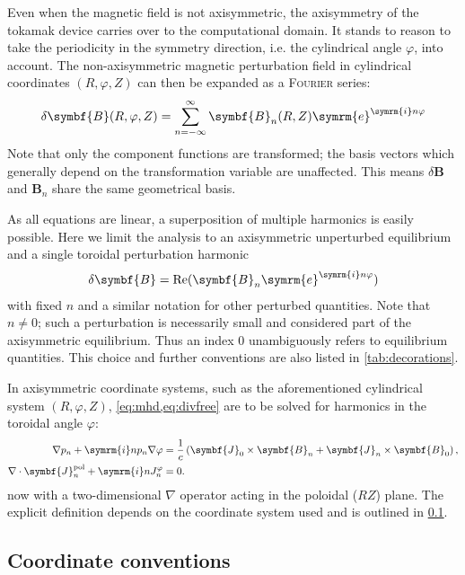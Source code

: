 \documentclass[a4paper, twoside, 10pt, english]{article}
\numberwithin{equation}{section}
\let\temp\varrho
\let\varrho\rho
\let\rho\temp
\let\temp\vartheta
\let\vartheta\theta
\let\theta\temp
\let\temp\varphi
\let\varphi\phi
\let\phi\temp
\let\vec\symbf
\DeclareMathOperator\Real{Re}
\newcommand*\grad{\ensuremath{\nabla}}
\newcommand*\divg{\ensuremath{\nabla \cdot}}
\newcommand*\e{\ensuremath{\symrm{e}}}  %
\newcommand*\im{\ensuremath{\symrm{i}}}  %
\newcommand*\pol{\ensuremath{\textrm{pol}}}  %
\newcommand*\Bpert{\ensuremath{\delta \vec{B}}}  %
\begin{document}
Even when the magnetic field is not axisymmetric, the axisymmetry of the tokamak device carries over to the computational domain. It stands to reason to take the periodicity in the symmetry direction, i.e. the cylindrical angle $\phi$, into account. The non-axisymmetric magnetic perturbation field in cylindrical coordinates $(R, \phi, Z)$ can then be expanded as a \textsc{Fourier} series:
\begin{gather}
  \Bpert (R, \phi, Z) = \sum_{n = -\infty}^{\infty} \vec{B}_{n} (R, Z) \e^{\im n \phi}
\end{gather}
Note that only the component functions are transformed; the basis vectors which generally depend on the transformation variable are unaffected. This means $\Bpert$ and $\vec{B}_{n}$ share the same geometrical basis.

As all equations are linear, a superposition of multiple harmonics is easily possible. Here we limit the analysis to an axisymmetric unperturbed equilibrium and a single toroidal perturbation harmonic
\begin{gather}
  \Bpert = \Real (\vec{B}_{n} \e^{\im n \phi})
\end{gather}
with fixed $n$ and a similar notation for other perturbed quantities. Note that $n \neq 0$; such a perturbation is necessarily small and considered part of the axisymmetric equilibrium. Thus an index $0$ unambiguously refers to equilibrium quantities. This choice and further conventions are also listed in \cref{tab:decorations}.

In axisymmetric coordinate systems, such as the aforementioned cylindrical system $(R, \phi, Z)$, \cref{eq:mhd,eq:divfree} are to be solved for harmonics in the toroidal angle $\phi$:
\begin{align}
  \grad p_{n} + \im n p_{n} \grad \phi &= \frac{1}{c} \left( \vec{J}_{0} \times \vec{B}_{n} + \vec{J}_{n} \times \vec{B}_{0} \right), \label{eq:mhd-phi} \\
  \divg \vec{J}_{n}^{\pol}+ \im n J_{n}^{\phi} &= 0. \label{eq:divfree-phi}
\end{align}
now with a two-dimensional $\nabla$ operator acting in the poloidal ($RZ$) plane. The explicit definition depends on the coordinate system used and is outlined in \cref{sec:cocos}.

\subsection{Coordinate conventions}
\label{sec:cocos}
\end{document}
